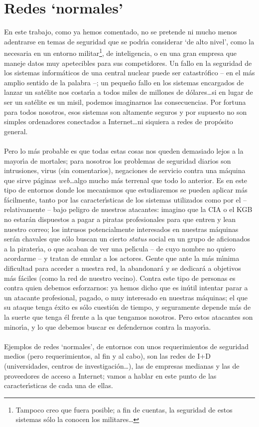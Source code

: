\section{Redes `normales'}
En este trabajo, como ya hemos comentado, no se pretende ni mucho menos 
adentrarse en temas de seguridad que se podr\'{\i}a considerar `de alto nivel',
como la necesaria en un entorno militar\footnote{Tampoco creo que fuera posible;
a fin de cuentas, la seguridad de estos sistemas s\'olo la conocen los
militares\ldots}, de inteligencia, o en una gran empresa
que maneje datos muy apetecibles para sus competidores. Un fallo en la seguridad
de los sistemas inform\'aticos de una central nuclear puede ser catastr\'ofico
-- en el m\'as amplio sentido de la palabra --; un peque\~no fallo en los 
sistemas encargados de lanzar un sat\'elite nos costar\'{\i}a a todos miles de
millones de d\'olares\ldots si en lugar de ser un sat\'elite es un misil, 
podemos imaginarnos las consecuencias. Por fortuna para todos nosotros, esos
sistemas son altamente seguros y por supuesto no son simples ordenadores 
conectados a Internet\ldots ni siquiera a redes de prop\'osito general.\\
\\Pero lo m\'as probable es que todas estas cosas nos queden demasiado lejos a
la mayor\'{\i}a de mortales; para nosotros los problemas de seguridad diarios
son intrusiones, virus (sin comentarios), negaciones de servicio contra una
m\'aquina que sirve p\'aginas {\it web}\ldots algo mucho m\'as terrenal que todo
lo anterior. Es en este tipo de entornos donde los mecanismos que estudiaremos
se pueden aplicar m\'as f\'acilmente, tanto por las caracter\'{\i}sticas de los
sistemas utilizados como por el -- relativamente -- bajo peligro de nuestros
atacantes: imagino que la CIA o el KGB no estar\'an dispuestos a pagar a 
piratas profesionales para que entren y lean nuestro correo; los intrusos 
potencialmente interesados en nuestras m\'aquinas ser\'an chavales que s\'olo
buscan un cierto {\it status} social en un grupo de aficionados a la 
pirater\'{\i}a, o que acaban de ver una pel\'{\i}cula -- de cuyo nombre no
quiero acordarme -- y tratan de emular a los actores. Gente que ante la m\'as
m\'{\i}nima dificultad para acceder a nuestra red, la abandonar\'a y se 
dedicar\'a a objetivos m\'as f\'aciles (como la red de nuestro vecino). Contra
este tipo de personas es contra quien debemos esforzarnos: ya hemos dicho que
es in\'util intentar parar a un atacante profesional, pagado, o muy interesado
en nuestras m\'aquinas; el que su ataque tenga \'exito es s\'olo cuesti\'on de
tiempo, y seguramente depende m\'as de la suerte que tenga \'el frente a la que
tengamos nosotros. Pero estos atacantes son minor\'{\i}a, y lo que debemos 
buscar es defendernos contra la mayor\'{\i}a.\\
\\Ejemplos de redes `normales', de entornos con unos requerimientos de seguridad
medios (pero requerimientos, al fin y al cabo), son las redes de I+D 
(universidades, centros de investigaci\'on\ldots), las de empresas medianas y 
las de proveedores de acceso a Internet; vamos a hablar en este punto de las
caracter\'{\i}sticas de cada una de ellas.
